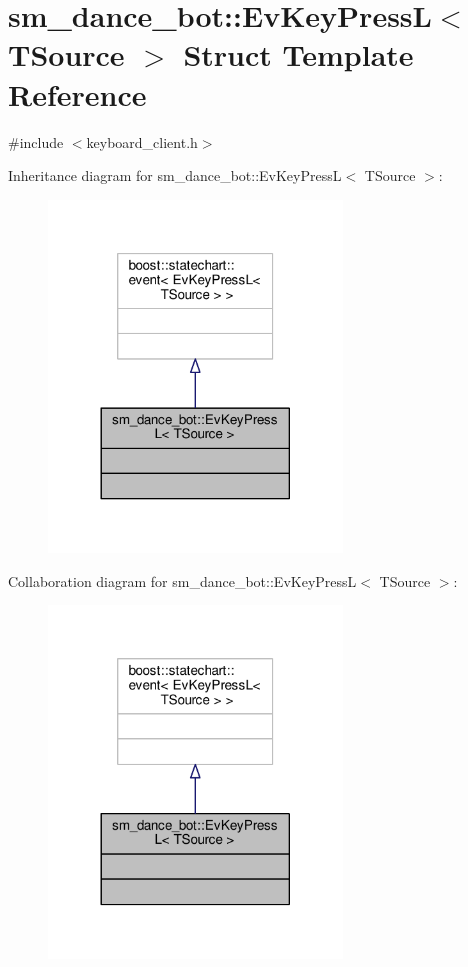 \hypertarget{structsm__dance__bot_1_1EvKeyPressL}{}\section{sm\+\_\+dance\+\_\+bot\+:\+:Ev\+Key\+PressL$<$ T\+Source $>$ Struct Template Reference}
\label{structsm__dance__bot_1_1EvKeyPressL}


{\ttfamily \#include $<$keyboard\+\_\+client.\+h$>$}



Inheritance diagram for sm\+\_\+dance\+\_\+bot\+:\+:Ev\+Key\+PressL$<$ T\+Source $>$\+:
\nopagebreak
\begin{figure}[H]
\begin{center}
\leavevmode
\includegraphics[width=221pt]{structsm__dance__bot_1_1EvKeyPressL__inherit__graph}
\end{center}
\end{figure}


Collaboration diagram for sm\+\_\+dance\+\_\+bot\+:\+:Ev\+Key\+PressL$<$ T\+Source $>$\+:
\nopagebreak
\begin{figure}[H]
\begin{center}
\leavevmode
\includegraphics[width=221pt]{structsm__dance__bot_1_1EvKeyPressL__coll__graph}
\end{center}
\end{figure}


